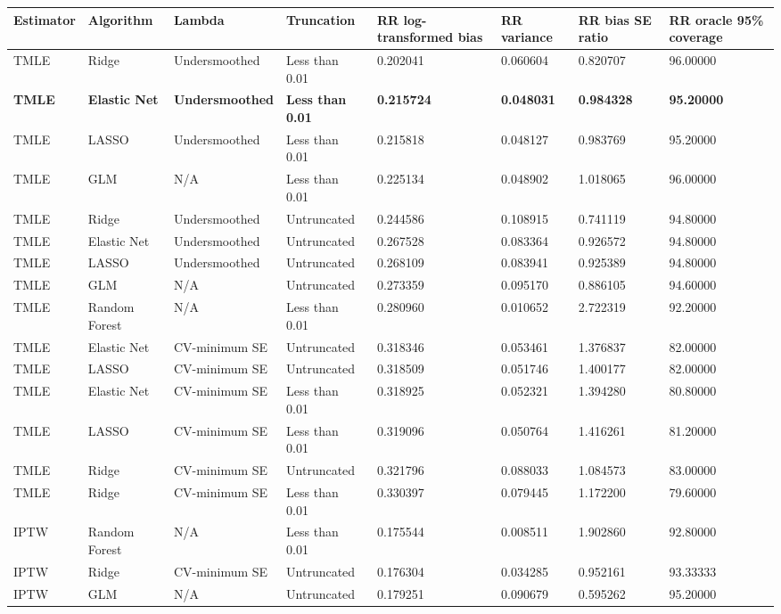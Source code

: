 
\begin{longtable}[l]{llllllll}
\toprule
Estimator & Algorithm & Lambda & Truncation & RR log-transformed bias & RR variance & RR bias SE ratio & RR oracle 95\% coverage\\
\midrule
TMLE & Ridge & Undersmoothed & Less than 0.01 & 0.202041 & 0.060604 & 0.820707 & 96.00000\\
\midrule
\textbf{TMLE} & \textbf{Elastic Net} & \textbf{Undersmoothed} & \textbf{Less than 0.01} & \textbf{0.215724} & \textbf{0.048031} & \textbf{0.984328} & \textbf{95.20000}\\
\midrule
TMLE & LASSO & Undersmoothed & Less than 0.01 & 0.215818 & 0.048127 & 0.983769 & 95.20000\\
TMLE & GLM & N/A & Less than 0.01 & 0.225134 & 0.048902 & 1.018065 & 96.00000\\
TMLE & Ridge & Undersmoothed & Untruncated & 0.244586 & 0.108915 & 0.741119 & 94.80000\\
TMLE & Elastic Net & Undersmoothed & Untruncated & 0.267528 & 0.083364 & 0.926572 & 94.80000\\
TMLE & LASSO & Undersmoothed & Untruncated & 0.268109 & 0.083941 & 0.925389 & 94.80000\\
TMLE & GLM & N/A & Untruncated & 0.273359 & 0.095170 & 0.886105 & 94.60000\\
TMLE & Random Forest & N/A & Less than 0.01 & 0.280960 & 0.010652 & 2.722319 & 92.20000\\
TMLE & Elastic Net & CV-minimum SE & Untruncated & 0.318346 & 0.053461 & 1.376837 & 82.00000\\
TMLE & LASSO & CV-minimum SE & Untruncated & 0.318509 & 0.051746 & 1.400177 & 82.00000\\
TMLE & Elastic Net & CV-minimum SE & Less than 0.01 & 0.318925 & 0.052321 & 1.394280 & 80.80000\\
TMLE & LASSO & CV-minimum SE & Less than 0.01 & 0.319096 & 0.050764 & 1.416261 & 81.20000\\
TMLE & Ridge & CV-minimum SE & Untruncated & 0.321796 & 0.088033 & 1.084573 & 83.00000\\
TMLE & Ridge & CV-minimum SE & Less than 0.01 & 0.330397 & 0.079445 & 1.172200 & 79.60000\\
IPTW & Random Forest & N/A & Less than 0.01 & 0.175544 & 0.008511 & 1.902860 & 92.80000\\
IPTW & Ridge & CV-minimum SE & Untruncated & 0.176304 & 0.034285 & 0.952161 & 93.33333\\
IPTW & GLM & N/A & Untruncated & 0.179251 & 0.090679 & 0.595262 & 95.20000\\

\end{longtable}
